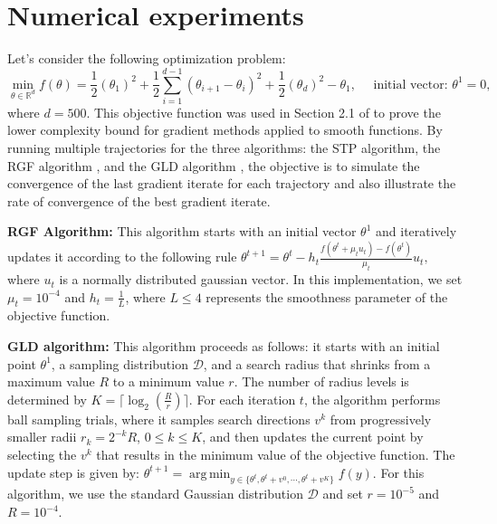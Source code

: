 \documentclass{article} %
\def\ceil#1{\lceil #1 \rceil}
\DeclareMathOperator*{\argmin}{arg\,min}
\begin{document}
\section{Numerical experiments}
\label{exper}
Let's consider the following optimization problem: 
$$\min_{\theta \in \mathbb{R}^d} f(\theta)=\frac{1}{2}\left( \theta_1\right)^2+\frac{1}{2} \sum_{i=1}^{d-1}\left(\theta_{i+1}-\theta_i\right)^2+\frac{1}{2}\left(\theta_d \right)^2-\theta_1,  \quad \text{ initial vector: } \theta^1=0,$$
where $d=500$. This objective function was used in Section 2.1 of \cite{nesterov2018lectures} to prove the lower complexity bound for gradient methods applied to smooth functions.
By running multiple trajectories for the three algorithms: the STP algorithm, the RGF algorithm \citep{nesterov2017random}, and the GLD algorithm \citep{golovin2019gradientless}, the objective is to simulate the convergence of the last gradient iterate for each trajectory and also illustrate the rate of convergence of the best gradient iterate. 

\textbf{RGF Algorithm: } This algorithm starts with an
initial vector $\theta^1$
and iteratively updates it according to the following rule
$
\theta^{t+1} = \theta^t - h_t \frac{f(\theta^t + \mu_t u_t) - f(\theta^t)}{\mu_t} u_t,
$
where $u_t$ is a normally distributed gaussian vector. In this implementation, we set $\mu_t = 10^{-4}$ and $h_t = \frac{1}{L}$, where $L\leq 4$ represents the smoothness parameter of the objective function.  %

\textbf{GLD algorithm:} This algorithm
proceeds as follows: it starts with an initial point \( \theta^1 \), a sampling distribution \( \mathcal{D} \), and a search radius that shrinks from a maximum value \( R \) to a minimum value \( r \). The number of radius levels is determined by 
\( K = \ceil{\log_2 \left(\frac{R}{r}\right)} \). For each iteration \( t \), the algorithm performs ball sampling trials, where it samples search directions \( v^k \) from progressively smaller radii \( r_k = 2^{-k} R \), $0\leq k \leq K$, and then updates the current point by selecting the \( v^k \) that results in the minimum value of the objective function. The update step is given by:
$
\theta^{t+1} = \argmin_{y\in\{\theta^t,\theta^t+v^0,\cdots,\theta^t+v^K\}}  f(y)$.
For this algorithm, we use the standard Gaussian distribution $\mathcal{D}$ and set $r=10^{-5}$ and $R=
10^{-4}$.
\end{document}

